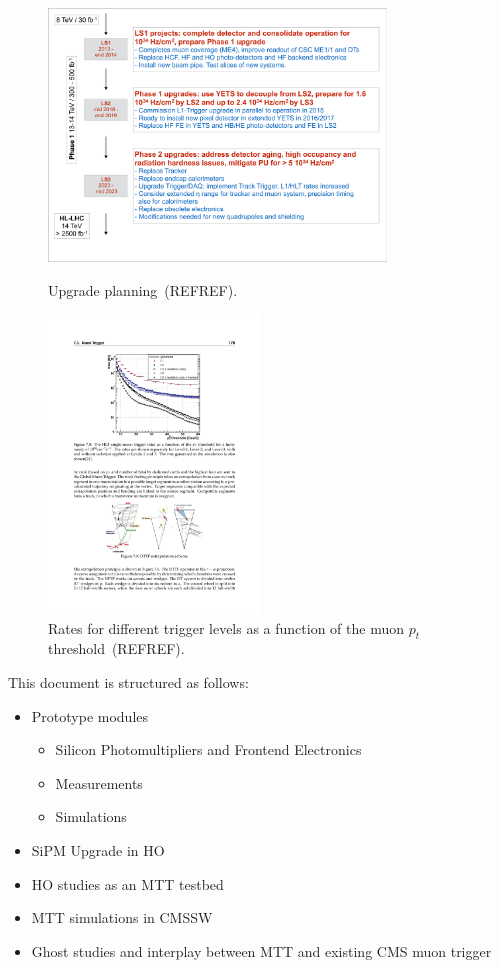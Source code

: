 \documentclass[11pt]{amsart}
\begin{document}
\begin{figure}[htbp]
\centering
\includegraphics[width=0.8\textwidth]{Figures/pooth/upgrade_planning.pdf}\\
\caption{Upgrade planning~(REFREF).} 
\label{fig:upgrade_planning}
\end{figure}
\begin{figure}[htbp]
\centering
\includegraphics[width=0.5\textwidth]{Figures/pooth/pt_threshold.pdf}
\caption{Rates for different trigger levels as a function of the muon $p_t$ threshold~(REFREF).}
\label{fig:pt_threshold}
\end{figure}

This document is structured as follows:
\begin{itemize}
\item Prototype modules
	\begin{itemize}
	\item Silicon Photomultipliers and Frontend Electronics
	\item Measurements
	\item Simulations
	\end{itemize}
\item SiPM Upgrade in HO 
\item HO studies as an MTT testbed
\item MTT simulations in CMSSW
\item Ghost studies and interplay between MTT and existing CMS muon trigger
\end{itemize}
\end{document}
